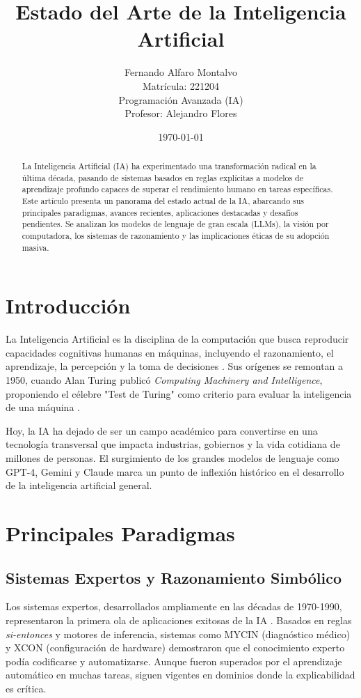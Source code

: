 \documentclass[12pt, a4paper]{article}
\title{\textbf{Estado del Arte de la Inteligencia Artificial}}
\author{Fernando Alfaro Montalvo\\
\small Matrícula: 221204\\
\small Programación Avanzada (IA)\\
\small Profesor: Alejandro Flores}
\date{\today}
\begin{document}
\maketitle

\begin{abstract}
La Inteligencia Artificial (IA) ha experimentado una transformación radical en la última década, pasando de sistemas basados en reglas explícitas a modelos de aprendizaje profundo capaces de superar el rendimiento humano en tareas específicas. Este artículo presenta un panorama del estado actual de la IA, abarcando sus principales paradigmas, avances recientes, aplicaciones destacadas y desafíos pendientes. Se analizan los modelos de lenguaje de gran escala (LLMs), la visión por computadora, los sistemas de razonamiento y las implicaciones éticas de su adopción masiva.
\end{abstract}

\section{Introducción}

La Inteligencia Artificial es la disciplina de la computación que busca reproducir capacidades cognitivas humanas en máquinas, incluyendo el razonamiento, el aprendizaje, la percepción y la toma de decisiones \cite{russell2020}. Sus orígenes se remontan a 1950, cuando Alan Turing publicó \textit{Computing Machinery and Intelligence}, proponiendo el célebre "Test de Turing" como criterio para evaluar la inteligencia de una máquina \cite{turing1950}.

Hoy, la IA ha dejado de ser un campo académico para convertirse en una tecnología transversal que impacta industrias, gobiernos y la vida cotidiana de millones de personas. El surgimiento de los grandes modelos de lenguaje como GPT-4, Gemini y Claude marca un punto de inflexión histórico en el desarrollo de la inteligencia artificial general.

\section{Principales Paradigmas}

\subsection{Sistemas Expertos y Razonamiento Simbólico}
Los sistemas expertos, desarrollados ampliamente en las décadas de 1970-1990, representaron la primera ola de aplicaciones exitosas de la IA \cite{feigenbaum1983}. Basados en reglas \textit{si-entonces} y motores de inferencia, sistemas como MYCIN (diagnóstico médico) y XCON (configuración de hardware) demostraron que el conocimiento experto podía codificarse y automatizarse. Aunque fueron superados por el aprendizaje automático en muchas tareas, siguen vigentes en dominios donde la explicabilidad es crítica.
\end{document}
